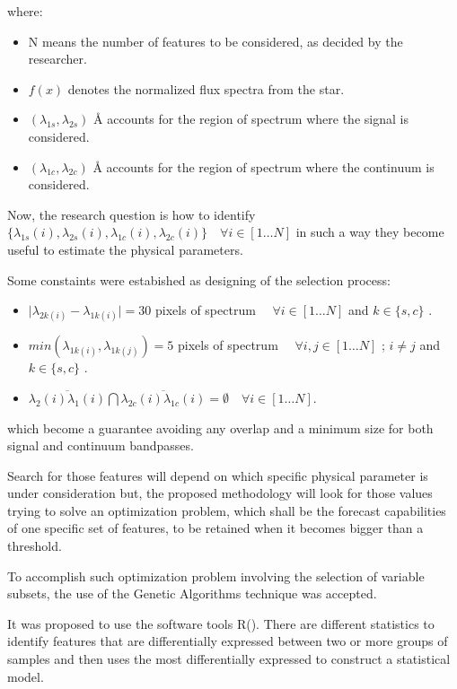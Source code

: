 {{{where:
\begin{itemize}
 \item {N means the number of features to be considered, as decided by the researcher.}
 \item {$f(x)$ denotes the normalized flux spectra from the star.}
 \item {$(\lambda_{1s},\lambda_{2s})$ {\AA} accounts for the region of spectrum where the signal is considered. \quad \label{eq:cons1}}
 \item {$(\lambda_{1c},\lambda_{2c})$ {\AA} accounts for the region of spectrum where the continuum is considered.}
\end{itemize}

{
Now, the research question is how to identify 
$\{\lambda_{1s}(i),\lambda_{2s}(i), \lambda_{1c}(i),\lambda_{2c}(i)\}  \quad \forall i \in [1 \ldots N] $
in such a way they become useful to estimate the physical parameters.

Some constaints were estabished as designing of the selection process:

\begin{itemize}
 \item { $ \vert \lambda_{2k(i)} - \lambda_{1k(i)} \vert = 30 $ pixels of spectrum $ \quad \forall i \in [1 \ldots N]$ and $ k \in \{s,c\} $ .}
 \item { $ min ( \lambda_{1k(i)}, \lambda_{1k(j)} ) = 5 $ pixels of spectrum $ \quad \forall i,j \in [1 \ldots N] $ ; $ i \neq j $ and $ k \in \{s,c\} $ .}
 \item { $ \overline{\lambda_{2}(i)\lambda_{1}(i)}  \bigcap 
                      \overline{\lambda_{2c}(i)\lambda_{1c}(i)} = \emptyset \quad \forall i \in [1 \ldots N]$.}
\end{itemize}

which become a guarantee avoiding any overlap 
and a minimum size for both signal and continuum bandpasses.
}

{
Search for those features will depend on which specific physical parameter is 
under consideration but, the proposed methodology will look for those values 
trying to solve an optimization problem, which shall be the forecast capabilities
of one specific set of features, to be retained when it becomes bigger than 
a threshold.

To accomplish such optimization problem involving the selection of variable 
subsets, the use of the Genetic Algorithms technique was accepted. 
}

{ It was proposed to use the software tools R(\cite{R2013}).  There
  are different statistics to identify features that are
  differentially expressed between two or more groups of samples and
  then uses the most differentially expressed to construct a
  statistical model.  }

}}}
